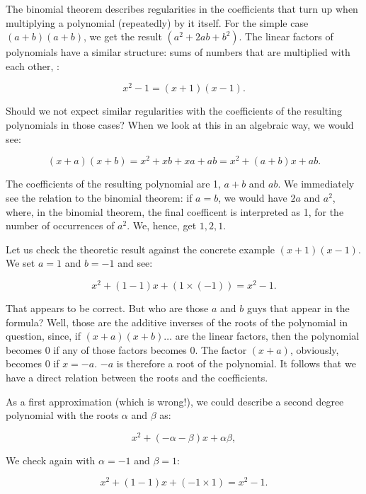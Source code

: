\documentclass[tikz]{scrreprt}
\begin{document}
The binomial theorem describes regularities 
in the coefficients that turn up
when multiplying a polynomial (repeatedly) by it itself.
For the simple case $(a+b)(a+b)$, we get the result
$(a^2 + 2ab + b^2)$. The linear factors of polynomials
have a similar structure: sums of numbers that are
multiplied with each other, \eg:

\begin{equation}
x^2 - 1 = (x+1)(x-1).
\end{equation}

Should we not expect similar regularities
with the coefficients of the resulting polynomials
in those cases? When we look at this in an algebraic
way, we would see:

\begin{equation}
(x+a)(x+b) = x^2+xb+xa+ab = x^2 + (a+b)x + ab.
\end{equation}

The coefficients of the resulting polynomial are
1, $a+b$ and $ab$. We immediately see the relation
to the binomial theorem:
if $a=b$, we would have $2a$ and $a^2$, where,
in the binomial theorem, the final coefficent is
interpreted as 1, for the number of occurrences of
$a^2$. We, hence, get $1, 2, 1$.

Let us check the theoretic result against
the concrete example $(x+1)(x-1)$. We set
$a=1$ and $b=-1$ and see:

\begin{equation}
x^2 + (1-1)x + (1\times (-1)) = x^2 - 1.
\end{equation}

That appears to be correct. But who are 
those $a$ and $b$ guys that appear in
the formula? Well, those are the additive
inverses of the roots of the polynomial in
question, since, if $(x+a)(x+b)\dots$ are the linear
factors, then the polynomial becomes 0 if any
of those factors becomes 0. The factor $(x+a)$,
obviously, becomes 0 if $x=-a$. $-a$ is therefore
a root of the polynomial. It follows that we
have a direct relation between the roots and
the coefficients.

As a first approximation (which is wrong!),
we could describe a second degree polynomial 
with the roots
$\alpha$ and $\beta$ as:

\[
x^2 + (-\alpha-\beta)x + \alpha\beta,
\]

We check again with $\alpha = -1$ and $\beta=1$:

\begin{equation}
x^2 + (1-1)x + (-1\times 1) = x^2 - 1.
\end{equation}
\end{document}
